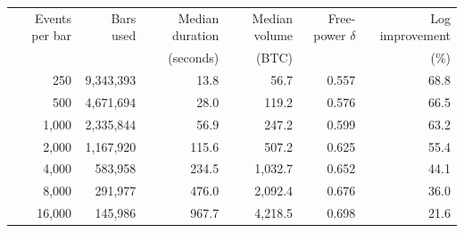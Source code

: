\begin{tabular}{rrrrrr}
\toprule
Events per bar & Bars used & Median duration & Median volume & Free-power $\delta$ & Log improvement \\
 & & (seconds) & (BTC) & & (\%) \\
\midrule
250 & 9,343,393 & 13.8 & 56.7 & 0.557 & 68.8 \\
500 & 4,671,694 & 28.0 & 119.2 & 0.576 & 66.5 \\
1,000 & 2,335,844 & 56.9 & 247.2 & 0.599 & 63.2 \\
2,000 & 1,167,920 & 115.6 & 507.2 & 0.625 & 55.4 \\
4,000 & 583,958 & 234.5 & 1,032.7 & 0.652 & 44.1 \\
8,000 & 291,977 & 476.0 & 2,092.4 & 0.676 & 36.0 \\
16,000 & 145,986 & 967.7 & 4,218.5 & 0.698 & 21.6 \\
\bottomrule
\end{tabular}
